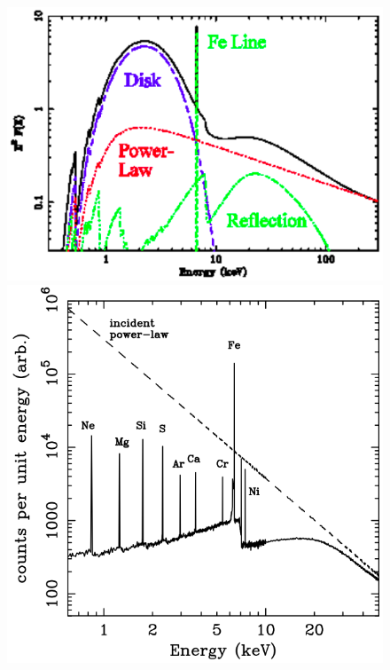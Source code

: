 \documentclass[a4paper,titlepage]{book}     	%
\begin{document}
\begin{figure}
	\begin{minipage}{.58\textwidth}
		\centering
		\includegraphics[width=\textwidth]{./images/accretiondiskSED.png}
	\end{minipage}
	\hfill
	\begin{minipage}{.42\textwidth}
		\centering
		\includegraphics[width=\textwidth]{./images/accretiondiskFeKalphaline.png}	

\end{minipage}
\end{figure}
\end{document}
